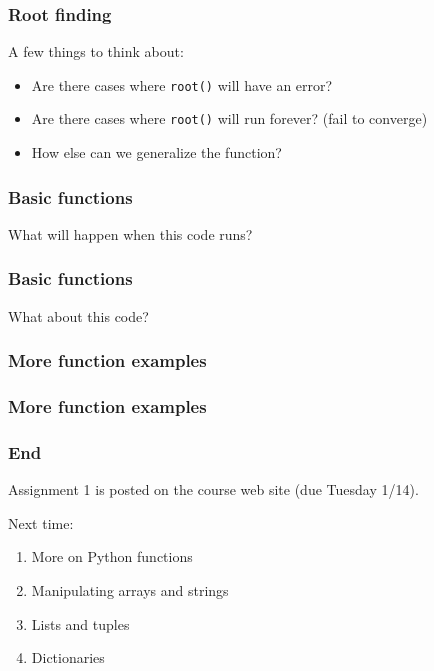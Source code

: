 \documentclass{beamer}
\begin{document}
\begin{frame}
\frametitle{Root finding}
A few things to think about:
\vspace{0.1in}
\begin{itemize}
\setlength{\itemsep}{0.1in}
\item{Are there cases where \texttt{root()} will have an error?}
\item{Are there cases where \texttt{root()} will run forever? (fail to converge)}
\item{How else can we generalize the function?}
\end{itemize}
\end{frame}


\begin{frame}
\frametitle{Basic functions}

What will happen when this code runs?



\end{frame}

\begin{frame}
\frametitle{Basic functions}

What about this code?



\end{frame}


\begin{frame}
\frametitle{More function examples}



\end{frame}

\begin{frame}
\frametitle{More function examples}



\end{frame}


\begin{frame}
\frametitle{End}
Assignment 1 is posted on the course web site (due Tuesday 1/14).

\vspace{0.2in}

Next time:
\begin{enumerate}
\setlength{\itemsep}{0.05in}
\item{More on Python functions}
\item{Manipulating arrays and strings}
\item{Lists and tuples}
\item{Dictionaries}
\end{enumerate}

\end{frame}
\end{document}
